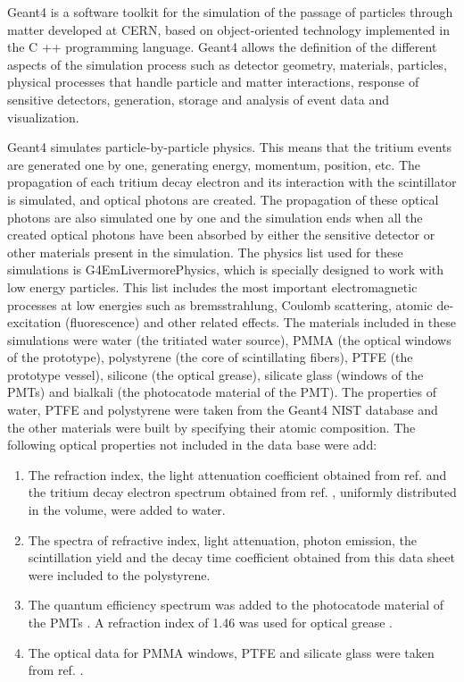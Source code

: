 Geant4 is a software toolkit for the simulation of the passage of particles through matter developed at CERN, based on object-oriented technology implemented in the C ++ programming language. Geant4 allows the definition of the different aspects of the simulation process such as detector geometry, materials, particles, physical processes that handle particle and matter interactions, response of sensitive detectors, generation, storage and analysis of event data and visualization.

Geant4 simulates particle-by-particle physics. This means that the tritium events are generated one by one, generating energy, momentum, position, etc. The propagation of each tritium decay electron and its interaction  with the scintillator is simulated, and optical photons are created. The propagation of these optical photons are also simulated one by one and the simulation ends when all the created optical photons have been absorbed by either the sensitive detector or other materials present in the simulation. The physics list used for these simulations is G4EmLivermorePhysics, which is specially designed to work with low energy particles. This list includes the most important electromagnetic processes at low energies such as bremsstrahlung, Coulomb scattering, atomic de-excitation (fluorescence) and other related effects. The materials included in these simulations were water (the tritiated water source), PMMA (the optical windows of the prototype), polystyrene (the core of scintillating fibers), PTFE (the prototype vessel), silicone (the optical grease), silicate glass (windows of the PMTs) and bialkali (the photocatode material of the PMT). The properties of water, PTFE and polystyrene were taken from the Geant4 NIST database and the other materials were built by specifying their atomic composition. The following optical properties not included in the data base were add:

\begin{enumerate}
%
\item{} The refraction index, the light attenuation coefficient obtained from ref. \cite{WaterPropertiesSimulation} and the tritium decay electron spectrum obtained from ref. \cite{TritiumEmissionSpectrum}, uniformly distributed in the volume, were added to water. 

\item{} The spectra of refractive index, light attenuation, photon emission, the scintillation yield and the decay time coefficient obtained from this data sheet \cite{DataSheetBCF12Fiber} were included to the polystyrene.

\item{} The quantum efficiency spectrum was added to the photocatode material of the PMTs \cite{DataSheetPMTs}. A refraction index of 1.46 was used for optical grease \cite{OpticalGrease}.

\item{} The optical data for PMMA windows, PTFE and silicate glass were taken from ref. \cite{NEMODataSimulation}.

\end{enumerate} 
